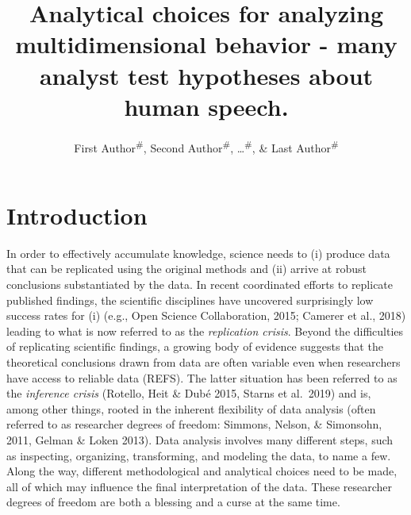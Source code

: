 \documentclass[
  english,
  man]{apa6}
\title{Analytical choices for analyzing multidimensional behavior - many analyst test hypotheses about human speech.}
\author{First Author\textsuperscript{\#}, Second Author\textsuperscript{\#}, \ldots{}\textsuperscript{\#}, \& Last Author\textsuperscript{\#}}
\date{}
\affiliation{\vspace{0.5cm}\textsuperscript{1} \#\\\textsuperscript{\ldots{}} \ldots{}}
\begin{document}
\maketitle

\hypertarget{introduction}{%
\section{Introduction}\label{introduction}}

In order to effectively accumulate knowledge, science needs to (i) produce data that can be replicated using the original methods and (ii) arrive at robust conclusions substantiated by the data.
In recent coordinated efforts to replicate published findings, the scientific disciplines have uncovered surprisingly low success rates for (i) (e.g., Open Science Collaboration, 2015; Camerer et al., 2018) leading to what is now referred to as the \emph{replication crisis}.
Beyond the difficulties of replicating scientific findings, a growing body of evidence suggests that the theoretical conclusions drawn from data are often variable even when researchers have access to reliable data (REFS).
The latter situation has been referred to as the \emph{inference crisis} (Rotello, Heit \& Dubé 2015, Starns et al.~2019) and is, among other things, rooted in the inherent flexibility of data analysis (often referred to as researcher degrees of freedom: Simmons, Nelson, \& Simonsohn, 2011, Gelman \& Loken 2013).
Data analysis involves many different steps, such as inspecting, organizing, transforming, and modeling the data, to name a few.
Along the way, different methodological and analytical choices need to be made, all of which may influence the final interpretation of the data.
These researcher degrees of freedom are both a blessing and a curse at the same time.
\end{document}
